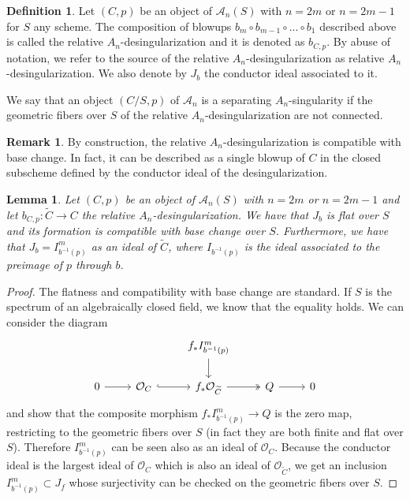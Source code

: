 \documentclass{alggeom}
\numberwithin{equation}{section}
\numberwithin{subsection}{section}
\newtheorem{lemma}[theorem]{Lemma}
\theoremstyle{definition}
\newtheorem{definition}[theorem]{Definition}
\newtheorem{remark}[theorem]{Remark}
\theoremstyle{remark}
\newcommand\cA{\mathcal{A}} \newcommand\cB{\mathcal{B}}
\newcommand\cO{\mathcal{O}} \newcommand\cP{\mathcal{P}}
\begin{document}
\begin{definition}
	Let $(C,p)$ be an object of $\cA_n(S)$ with $n=2m$ or $n=2m-1$ for $S$ any scheme. The composition of blowups $b_m\circ b_{m-1} \circ \dots \circ b_{1}$ described above is called the relative $A_n$-desingularization and it is denoted as $b_{C,p}$. By abuse of notation, we refer to the source of the relative $A_n$-desingularization as relative $A_n$-desingularization. We also denote by $J_b$ the conductor ideal associated to it. 
	
	We say that an object $(C/S,p)$ of $\cA_n$ is a separating $A_n$-singularity if the geometric fibers over $S$ of the relative $A_n$-desingularization are not connected. 
\end{definition}
\begin{remark}
	By construction, the relative $A_n$-desingularization is compatible with base change. In fact, it can be described as a single blowup of $C$ in the closed subscheme defined by the conductor ideal of the desingularization.
\end{remark}

\begin{lemma}\label{lem:conductor}
	Let $(C,p)$ be an object of $\cA_n(S)$ with $n=2m$ or $n=2m-1$ and let $b_{C,p}:\widetilde{C}\rightarrow C$ the relative $A_n$-desingularization. We have that $J_b$ is flat over $S$ and its formation is compatible with base change over $S$. Furthermore, we have that $J_b=I_{b^{-1}(p)}^m$ as an ideal of $\widetilde{C}$, where $I_{b^{-1}(p)}$ is the ideal associated to the preimage of $p$ through $b$.
\end{lemma}


\begin{proof}
	The flatness and compatibility with base change are standard. If $S$ is the spectrum of an algebraically closed field, we know that the equality holds. We can consider the diagram
	$$
	\begin{tikzcd}
		&                       & f_*I_{b^{-1}(p)}^m \arrow[d]                       &             &   \\
		0 \arrow[r] & \cO_C \arrow[r, hook] & f_*\cO_{\widetilde{C}} \arrow[r, two heads] & Q \arrow[r] & 0
	\end{tikzcd}
	$$ 
	and show that the composite morphism $f_*I_{b^{-1}(p)}^m\rightarrow Q$ is the zero map, restricting to the geometric fibers over $S$ (in fact they are both finite and flat over $S$). Therefore $I_{b^{-1}(p)}^m$ can be seen also as an ideal of $\cO_{C}$. Because the conductor ideal is the largest ideal of $\cO_{C}$ which is also an ideal of $\cO_{\widetilde{C}}$, we get an inclusion $I_{b^{-1}(p)}^m\subset J_f$ whose surjectivity can be checked on the geometric fibers over $S$.
\end{proof}
\end{document}
